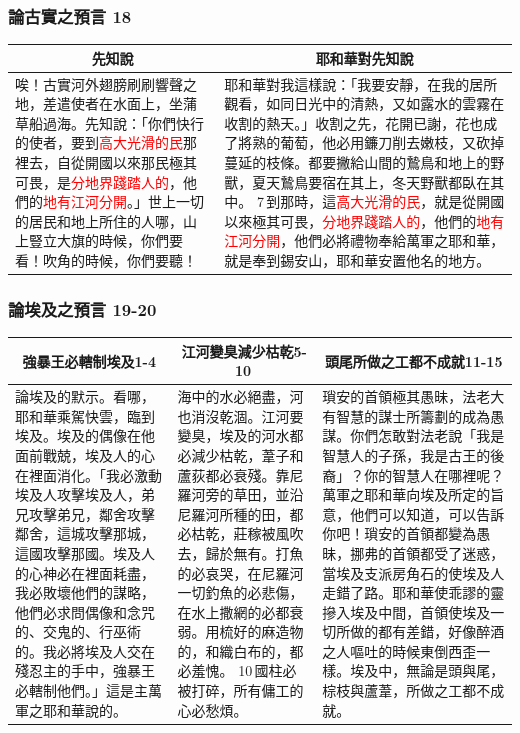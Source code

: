 \subsubsection{論古實之預言 18}
\begin{table}[H]
\centering
\begin{tabular}{p{6.75cm}|p{10.50cm}}\hline\hline
\multicolumn{1}{c|}{先知說}&\multicolumn{1}{c}{耶和華對先知說}\\\hline
唉！古實河外翅膀刷刷響聲之地，差遣使者在水面上，坐蒲草船過海。先知說：「你們快行的使者，要到\textcolor{red}{高大光滑的民}那裡去，自從開國以來那民極其可畏，是\textcolor{red}{分地界踐踏人的}，他們的\textcolor{red}{地有江河分開}。」世上一切的居民和地上所住的人哪，山上豎立大旗的時候，你們要看！吹角的時候，你們要聽！
&耶和華對我這樣說：「我要安靜，在我的居所觀看，如同日光中的清熱，又如露水的雲霧在收割的熱天。」收割之先，花開已謝，花也成了將熟的葡萄，他必用鐮刀削去嫩枝，又砍掉蔓延的枝條。都要撇給山間的鷙鳥和地上的野獸，夏天鷙鳥要宿在其上，冬天野獸都臥在其中。 7 到那時，這\textcolor{red}{高大光滑的民}，就是從開國以來極其可畏，\textcolor{red}{分地界踐踏人的}，他們的\textcolor{red}{地有江河分開}，他們必將禮物奉給萬軍之耶和華，就是奉到錫安山，耶和華安置他名的地方。\\\hline
\end{tabular}
\end{table}



\subsubsection{論埃及之預言 19-20}
\begin{table}[H]
\centering
\begin{tabular}{p{5.5cm}|p{4.75cm}|p{}}\hline\hline
\multicolumn{1}{c|}{強暴王必轄制埃及1-4}&\multicolumn{1}{c|}{ 江河變臭減少枯乾5-10}&\multicolumn{1}{c}{頭尾所做之工都不成就11-15}\\\hline
論埃及的默示。看哪，耶和華乘駕快雲，臨到埃及。埃及的偶像在他面前戰兢，埃及人的心在裡面消化。「我必激動埃及人攻擊埃及人，弟兄攻擊弟兄，鄰舍攻擊鄰舍，這城攻擊那城，這國攻擊那國。埃及人的心神必在裡面耗盡，我必敗壞他們的謀略，他們必求問偶像和念咒的、交鬼的、行巫術的。我必將埃及人交在殘忍主的手中，強暴王必轄制他們。」這是主萬軍之耶和華說的。
&海中的水必絕盡，河也消沒乾涸。江河要變臭，埃及的河水都必減少枯乾，葦子和蘆荻都必衰殘。靠尼羅河旁的草田，並沿尼羅河所種的田，都必枯乾，莊稼被風吹去，歸於無有。打魚的必哀哭，在尼羅河一切釣魚的必悲傷，在水上撒網的必都衰弱。用梳好的麻造物的，和織白布的，都必羞愧。 10 國柱必被打碎，所有傭工的心必愁煩。
&瑣安的首領極其愚昧，法老大有智慧的謀士所籌劃的成為愚謀。你們怎敢對法老說「我是智慧人的子孫，我是古王的後裔」？你的智慧人在哪裡呢？萬軍之耶和華向埃及所定的旨意，他們可以知道，可以告訴你吧！瑣安的首領都變為愚昧，挪弗的首領都受了迷惑，當埃及支派房角石的使埃及人走錯了路。耶和華使乖謬的靈摻入埃及中間，首領使埃及一切所做的都有差錯，好像醉酒之人嘔吐的時候東倒西歪一樣。埃及中，無論是頭與尾，棕枝與蘆葦，所做之工都不成就。\\\hline
\end{tabular}
\end{table}




